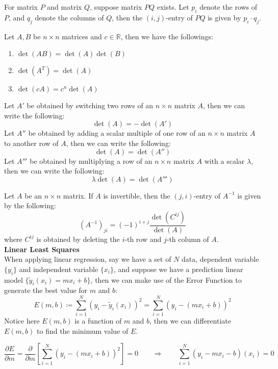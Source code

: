 \documentclass[11pt]{article}
\theoremstyle{break}
\theoremstyle{break}
\newcommand{\R}{\mathbb{R}}
\begin{document}
For matrix $P$ and matrix $Q$, suppose matrix $PQ$ exists. Let $p_i$ denote the rows of $P$, and $q_j$ denote the columns of $Q$, then the $(i,j)$-entry of $PQ$ is given by $p_i\cdot q_j$.

Let $A,B$ be $n \times n$ matrices and $c \in \R$, then we have the followings:
\begin{enumerate}
\item $\det(AB) = \det(A)\det(B)$
\item $\det(A^T) = \det(A)$
\item $\det(cA) = c^n \det(A)$
\end{enumerate}

Let $A'$ be obtained by switching two rows of an $n\times n$ matrix $A$, then we can write the following:
$$\det(A) = -\det(A')$$
Let $A''$ be obtained by adding a scalar multiple of one row of an $n\times n$ matrix $A$ to another row of $A$, then we can write the following:
$$\det(A) = \det(A'')$$
Let $A'''$ be obtained by multiplying a row of an $n\times n$ matrix $A$ with a scalar $\lambda$, then we can write the following:
$$\lambda\det(A) = \det(A''')$$

Let $A$ be an $n\times n$ matrix. If $A$ is invertible, then the $(j,i)$-entry of $A^{-1}$ is given by the following:
$$(A^{-1})_{ji} = (-1)^{i+j} \frac{\det(C^{ij})}{\det (A)}$$
where $C^{ij}$ is obtained by deleting the $i$-th row and $j$-th column of $A$.\\

\textbf{Linear Least Squares}\\
When applying linear regression, say we have a set of $N$ data, dependent variable $\{y_i\}$ and independent variable $\{x_i\}$, and suppose we have a prediction linear model $\{\widetilde{y}_i(x_i) = mx_i +b \}$, then we can make use of the Error Function to generate the best value for $m$ and $b$:
$$E(m,b) \coloneqq \sum_{i=1}^N ( y_i - \widetilde{y}_i(x_i) )^2 = \sum_{i=1}^N ( y_i - (mx_i +b) )^2$$
Notice here $E(m,b)$ is a function of $m$ and $b$, then we can differentiate $E(m,b)$ to find the minimum value of $E$.  

$$\frac{\partial E}{\partial m}=\frac{\partial}{\partial m} \left[ \sum_{i=1}^N ( y_i - (mx_i +b) )^2 \right]= 0 \qquad\Rightarrow\qquad \sum_{i=1}^N (y_i-mx_i-b)(x_i) = 0$$
\end{document}
